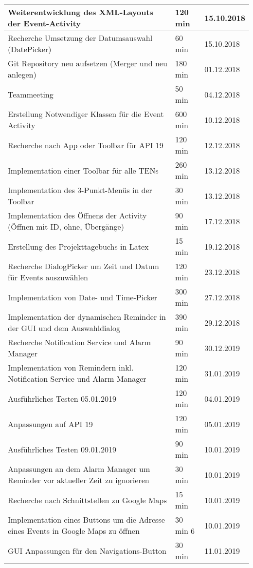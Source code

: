 \begin{longtable}{|p{10cm}|p{2cm}|p{2cm}|}
Weiterentwicklung des XML-Layouts der Event-Activity & 120 min & 15.10.2018\\ \hline
Recherche Umsetzung der Datumsauswahl (DatePicker) & 60 min & 15.10.2018\\ \hline
Git Repository neu aufsetzen (Merger und neu anlegen) & 180 min & 01.12.2018\\ \hline
Teammeeting & 50 min & 04.12.2018\\ \hline
Erstellung Notwendiger Klassen für die Event Activity & 600 min & 10.12.2018 \\ \hline
Recherche nach App oder Toolbar für API 19 & 120 min & 12.12.2018 \\ \hline
Implementation einer Toolbar für alle TENs & 260 min & 13.12.2018 \\ \hline
Implementation des 3-Punkt-Menüs in der Toolbar & 30 min & 13.12.2018 \\ \hline
Implementation des Öffnens der Activity (Öffnen mit ID, ohne, Übergänge) & 90 min &  17.12.2018\\ \hline
Erstellung des Projekttagebuchs in Latex & 15 min & 19.12.2018 \\ \hline
Recherche DialogPicker um Zeit und Datum für Events auszuwählen & 120 min & 23.12.2018 \\ \hline
Implementation von Date- und Time-Picker & 300 min & 27.12.2018 \\ \hline
Implementation der dynamischen Reminder in der GUI und dem Auswahldialog & 390 min & 29.12.2018 \\ \hline
Recherche Notification Service und Alarm Manager & 90 min & 30.12.2019 \\ \hline
Implementation von Remindern inkl. Notification Service und Alarm Manager & 120 min & 31.01.2019 \\ \hline
Ausführliches Testen 05.01.2019 & 120 min & 04.01.2019\\ \hline
Anpassungen auf API 19 & 120 min & 05.01.2019 \\ \hline
Ausführliches Testen 09.01.2019 & 90 min & 10.01.2019\\ \hline
Anpassungen an dem Alarm Manager um Reminder vor aktueller Zeit zu ignorieren & 30 min & 10.01.2019 \\ \hline
Recherche nach Schnittstellen zu Google Maps & 15 min & 10.01.2019 \\ \hline
Implementation eines Buttons um die Adresse eines Events in Google Maps zu öffnen & 30 min 6 & 10.01.2019 \\ \hline
GUI Anpassungen für den Navigations-Button & 30 min & 11.01.2019 \\ \hline

\end{longtable}

